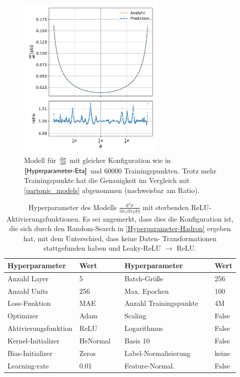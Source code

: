 \begin{figure}
	\centering
	\includegraphics[width=7cm]{graphics/2.2}
	\caption{Modell für $\derivative{\sigma}{\theta}$ mit gleicher Konfiguration wie in $\textsf{\autoref{Hyperparameter-Eta}}$ und 60000 Trainingspunkten. Trotz mehr Trainingspunkte hat die Genauigkeit im Vergleich mit \textsf{\autoref{partonic_models}} abgenommen (nachweisbar am Ratio).}
	\label{theta-bad-config}
\end{figure}
\begin{table}
	\centering
	\begin{tabular}{ll|ll}
		Hyperparameter & Wert & Hyperparameter & Wert \\
		\hline \hline
		Anzahl Layer & 5 & 		Batch-Größe & 256 \\
		Anzahl Units & 256 & 		Max. Epochen & 100\\
		Loss-Funktion & MAE & 		Anzahl Trainingspunkte $\quad$& 4M\\
		Optimizer & Adam &		Scaling & False \\
		Aktivierungsfunktion & ReLU & 		Logarithmus & False\\
		Kernel-Initializer & HeNormal$\quad$ & 		Basis 10 & False \\
		Bias-Initializer & Zeros &		Label-Normalisierung & keine \\
		Learning-rate & 0.01 & 		Feature-Normal. & False\\
	\end{tabular}
	\caption{Hyperparameter des Modells $\frac{\text{d}^3\sigma}{\text{d}x_1 \text{d}x_2\text{d}\eta}$ mit sterbenden ReLU- Aktivierungsfunktionen. Es sei angemerkt, dass dies die Konfiguration ist, die sich durch den Random-Search in \textsf{\autoref{Hyperparameter-Hadron}} ergeben hat, mit dem Unterschied, dass keine Daten- Transformationen stattgefunden haben und Leaky-ReLU $\rightarrow$ ReLU.}
	\label{Config-no-trans}
\end{table}
